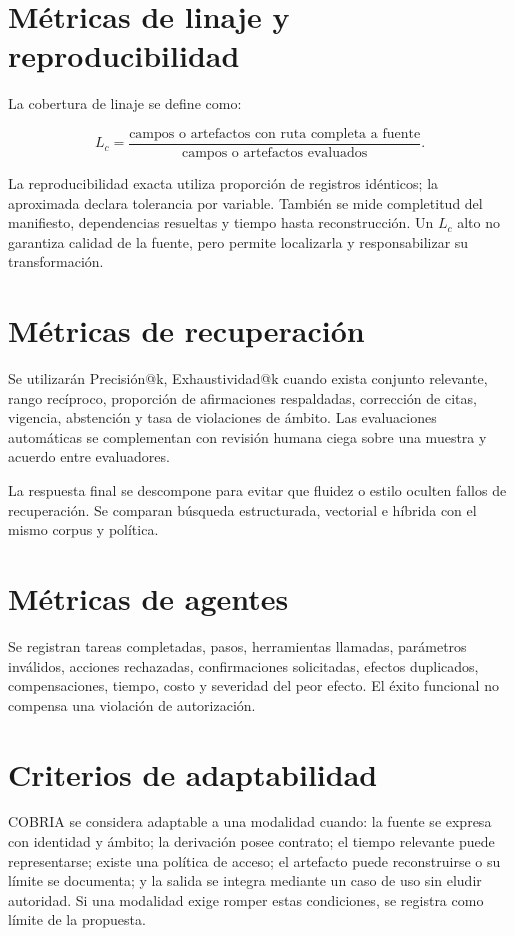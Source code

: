 \section{Métricas de linaje y reproducibilidad}

La cobertura de linaje se define como:

\begin{equation}
L_c=\frac{\text{campos o artefactos con ruta completa a fuente}}
{\text{campos o artefactos evaluados}}.
\end{equation}

La reproducibilidad exacta utiliza proporción de registros idénticos; la aproximada
declara tolerancia por variable. También se mide completitud del manifiesto, dependencias
resueltas y tiempo hasta reconstrucción. Un $L_c$ alto no garantiza calidad de la fuente,
pero permite localizarla y responsabilizar su transformación.

\section{Métricas de recuperación}

Se utilizarán Precisión@k, Exhaustividad@k cuando exista conjunto relevante, rango recíproco,
proporción de afirmaciones respaldadas, corrección de citas, vigencia, abstención y tasa
de violaciones de ámbito. Las evaluaciones automáticas se complementan con revisión
humana ciega sobre una muestra y acuerdo entre evaluadores.

La respuesta final se descompone para evitar que fluidez o estilo oculten fallos de
recuperación. Se comparan búsqueda estructurada, vectorial e híbrida con el mismo corpus
y política.

\section{Métricas de agentes}

Se registran tareas completadas, pasos, herramientas llamadas, parámetros inválidos,
acciones rechazadas, confirmaciones solicitadas, efectos duplicados, compensaciones,
tiempo, costo y severidad del peor efecto. El éxito funcional no compensa una violación
de autorización.

\section{Criterios de adaptabilidad}

COBRIA se considera adaptable a una modalidad cuando: la fuente se expresa con identidad
y ámbito; la derivación posee contrato; el tiempo relevante puede representarse; existe
una política de acceso; el artefacto puede reconstruirse o su límite se documenta; y la
salida se integra mediante un caso de uso sin eludir autoridad. Si una modalidad exige
romper estas condiciones, se registra como límite de la propuesta.

